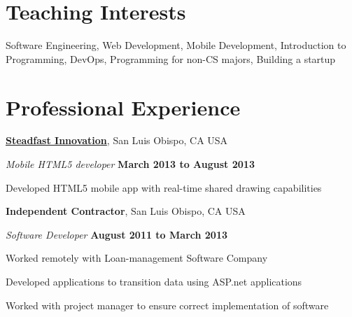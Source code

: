 \documentclass[10pt]{article}
\begin{document}
\section{Teaching Interests}

Software Engineering,
Web Development,
Mobile Development,
Introduction to Programming,
DevOps,
Programming for non-CS majors,
Building a startup

\vspace{-5pt}







\section{Professional Experience}

%
%


\href{http://steadfastinnovation.com/}{\textbf{Steadfast Innovation}},
San Luis Obispo, CA USA
\begin{outerlist}
\item[] \textit{Mobile HTML5 developer}%
    \hfill \textbf{March 2013 to August 2013}%
    \begin{innerlist}
    \item Developed HTML5 mobile app with real-time shared drawing capabilities 
    \end{innerlist}
\end{outerlist}

\halfblankline


{\textbf{Independent Contractor}}, San Luis Obispo, CA USA
\begin{outerlist}
\item[] \textit{Software Developer}%
    \hfill \textbf{August 2011 to March 2013}
    \begin{innerlist}%
    \item Worked remotely with Loan-management Software Company
    \item Developed applications to transition data using ASP.net applications
    \item Worked with project manager to ensure correct implementation of software
\end{innerlist}

\end{outerlist}
\end{document}
